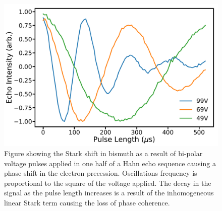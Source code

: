 \begin{figure}
\centering
\includegraphics[width=0.8\columnwidth]{Figures/BiMultiVolt.pdf}
\caption[Stark shift in bismuth]{Figure showing the Stark shift in bismuth as a result of bi-polar voltage pulses applied in one half of a Hahn echo sequence causing a phase shift in the electron precession. Oscillations frequency is proportional to the square of the voltage applied. The decay in the signal as the pulse length increases is a result of the inhomogeneous linear Stark term causing the loss of phase coherence.}
\label{fig:biStark}
\end{figure}

